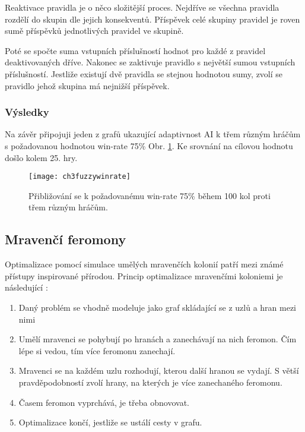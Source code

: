Reaktivace pravidla je o něco složitější proces. Nejdříve se všechna pravidla rozdělí do skupin dle jejich konsekventů. Příspěvek celé skupiny pravidel je roven sumě příspěvků jednotlivých pravidel ve skupině. 

Poté se spočte suma vstupních příslušností hodnot pro každé z pravidel deaktivovaných dříve. Nakonec se zaktivuje pravidlo s největší sumou vstupních příslušností. Jestliže existují dvě pravidla se stejnou hodnotou sumy, zvolí se pravidlo jehož skupina má nejnižší příspěvek.

\subsubsection{Výsledky}

Na závěr připojuji jeden z grafů ukazující adaptivnost AI k třem různým hráčům s požadovanou hodnotou win-rate 75\% Obr. \ref{fig-ch3fuzzywinrate}. Ke srovnání na cílovou hodnotu došlo kolem 25. hry. 

\begin{figure}
  \centering
  \texttt{[image: ch3fuzzywinrate]}
	\caption{Přibližování se k požadovanému win-rate 75\% během 100 kol proti třem různým hráčům. \cite{25deadend} }
	\label{fig-ch3fuzzywinrate}
\end{figure}

\subsection{Mravenčí feromony}

Optimalizace pomocí simulace umělých mravenčích kolonií patří mezi známé přístupy inspirované přírodou. Princip optimalizace mravenčími koloniemi je následující :


\begin{enumerate}
	\item Daný problém se vhodně modeluje jako graf skládající se z uzlů a hran mezi nimi
	\item Umělí mravenci se pohybují po hranách a zanechávají na nich feromon. Čím lépe si vedou, tím více feromonu zanechají.
	\item Mravenci se na každém uzlu rozhodují, kterou další hranou se vydají. S větší pravděpodobností zvolí hrany, na kterých je více zanechaného feromonu.
	\item Časem feromon vyprchává, je třeba obnovovat.
	\item Optimalizace končí, jestliže se ustálí cesty v grafu. 
\end{enumerate}

